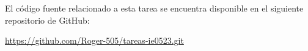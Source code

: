 \begin{framed}
El código fuente relacionado a esta tarea se encuentra disponible en el siguiente repositorio de GitHub:

\begin{center}
\url{https://github.com/Roger-505/tareas-ie0523.git}
\end{center}
\end{framed}
